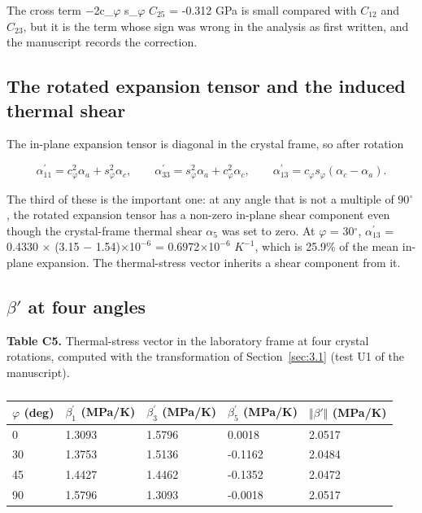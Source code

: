 \documentclass[preprint,12pt]{elsarticle}
\begin{document}
The cross term $-$2c\_$\varphi$ s\_$\varphi$ $C_{25}$ = -0.312 GPa is small compared with $C_{12}$ and $C_{23}$, but it is the term whose sign was wrong in the analysis as first written, and the manuscript records the correction.

\subsection{The rotated expansion tensor and the induced thermal shear}
\label{sec:3.3}

The in-plane expansion tensor is diagonal in the crystal frame, so after rotation

\begin{equation}
\alpha^{\prime}_{11}=c_\varphi^2\alpha_a+s_\varphi^2\alpha_c,\qquad\alpha^{\prime}_{33}=s_\varphi^2\alpha_a+c_\varphi^2\alpha_c,\qquad\alpha^{\prime}_{13}=c_\varphi s_\varphi\left(\alpha_c-\alpha_a\right). 
\label{eq:8}
\end{equation}

The third of these is the important one: at any angle that is not a multiple of 90$^{\circ}$, the rotated expansion tensor has a non-zero in-plane shear component even though the crystal-frame thermal shear $\alpha_{5}$ was set to zero. At $\varphi$ = 30$^{\circ}$, $\alpha ^{\prime}_{13}$ = 0.4330 $\times$ (3.15 $-$ 1.54)$\times$1$0^{-6}$ = 0.6972$\times$1$0^{-6}$ $K^{-1}$, which is 25.9\% of the mean in-plane expansion. The thermal-stress vector inherits a shear component from it.

\subsection{$\beta '$ at four angles}
\label{sec:3.4}

\textbf{Table C5.} Thermal-stress vector in the laboratory frame at four crystal rotations, computed with the transformation of Section~\ref{sec:3.1} (test U1 of the manuscript).

\begin{table}[htbp]
\centering
\caption{}
\label{tab:?}
\begin{tabular}{lllll}
\toprule
$\varphi$ (deg) & $\beta ^{\prime}_{1}$ (MPa/K) & $\beta ^{\prime}_{3}$ (MPa/K) & $\beta ^{\prime}_{5}$ (MPa/K) & $\Vert \beta '\Vert$ (MPa/K) \\
\midrule
0 & 1.3093 & 1.5796 & 0.0018 & 2.0517 \\
30 & 1.3753 & 1.5136 & -0.1162 & 2.0484 \\
45 & 1.4427 & 1.4462 & -0.1352 & 2.0472 \\
90 & 1.5796 & 1.3093 & -0.0018 & 2.0517 \\
\bottomrule
\end{tabular}
\end{table}
\end{document}
